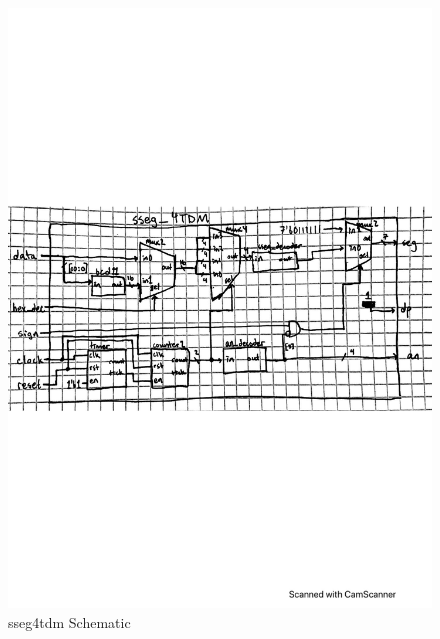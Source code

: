 \documentclass[11pt]{article}
\begin{document}
\begin{figure}[ht]\centering
	\includegraphics[width=1\textwidth,trim =0 200 0 0,clip, angle=0,origin=c]{sseg4tdmdiagram}
	\caption{sseg4tdm Schematic}
	\label{fig:sim_with_table}
\end{figure}
\end{document}
